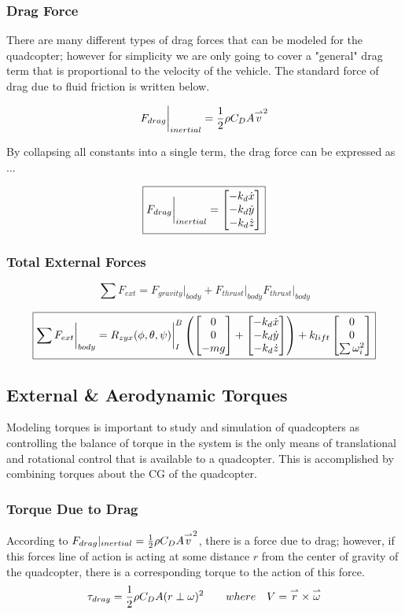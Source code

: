 \subsubsection{Drag Force}

There are many different types of drag forces that can be modeled for the quadcopter; however for simplicity we are only going to cover a "general" drag term that is proportional to the velocity of the vehicle. The standard force of drag due to fluid friction is written below. 

$$F_{drag}\biggr \rvert_{inertial} = \frac{1}{2}\rho C_{D} A \overset{\rightharpoonup}{v}^2$$

By collapsing all constants into a single term, the drag force can be expressed as ... 

$$ \boxed{F_{drag}\biggr \rvert_{inertial} = \begin{bmatrix} -k_d\dot{x} \\ -k_d\dot{y} \\ -k_d\dot{z} \end{bmatrix}}$$

\subsubsection{Total External Forces}

$$\sum F_{ext} = F_{gravity} \biggr\rvert_{body} + F_{thrust}\biggr \rvert_{body} F_{thrust}\biggr \rvert_{body}$$

$$\boxed{\sum F_{ext} \biggr\rvert_{body}= R_{zyx}(\phi, \theta, \psi)\biggr\rvert_{I}^{B}\left(\begin{bmatrix} 0 \\ 0 \\ -mg \end{bmatrix} + \begin{bmatrix} -k_d\dot{x} \\ -k_d\dot{y} \\ -k_d\dot{z} \end{bmatrix}\right) + k_{lift}\begin{bmatrix} 0 \\ 0 \\ \sum\omega_{i}^{2} \end{bmatrix} }$$


\subsection{External \& Aerodynamic Torques}

Modeling torques is important to study and simulation of quadcopters as controlling the balance of torque in the system is the only means of translational and rotational control that is available to a quadcopter. This is accomplished by combining torques about the CG of the quadcopter. 

\subsubsection{Torque Due to Drag}

According to $F_{drag} \rvert_{inertial} = \frac{1}{2}\rho C_{D} A \overset{\rightharpoonup}{v}^2$, there is a force due to drag; however, if this forces line of action is acting at some distance $r$ from the center of gravity of the quadcopter, there is a corresponding torque to the action of this force. 
$$\tau_{drag} = \frac{1}{2}\rho C_{D} A (r\perp\omega)^2 \quad \quad where \quad  V = \overset{\rightharpoonup}{r} \times \overset{\rightharpoonup}{\omega}$$

